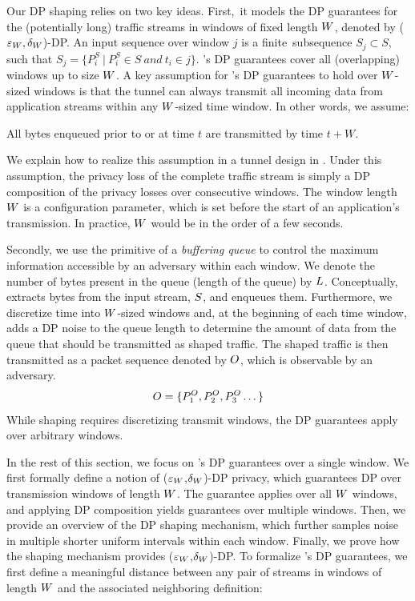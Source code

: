 Our DP shaping relies on two key ideas.
First,~it models the DP guarantees for the (potentially long) traffic streams in windows of fixed length $W$, denoted by \mbox{($\varepsilon_{W}, \delta_{W}$)-DP}.
An input sequence over window $j$ is a finite~sub\-sequence $S_{j} \subset S$, such that $S_{j} = \{ P^S_i~|~P^S_i \in S~and~t_i \in j \}$.
{\sys}'s DP guarantees cover all (overlapping) windows up to size $W$.
A key assumption for {\sys}'s DP guarantees to hold over $W$-sized windows is that the tunnel can always transmit all incoming data from application streams within any $W$-sized time window.
In other words, we assume:
\begin{assumption}\label{assumption:window}
  All bytes enqueued prior to or at time $t$ are transmitted by time
  $t+W$.
\end{assumption}
We explain how to realize this assumption in a tunnel design in .
Under this assumption, the privacy loss of the complete traffic stream is simply a DP composition of the privacy losses over consecutive windows.
The window length $W$ is a configuration parameter, which is set before the start of an application's transmission. In practice, $W$ would be in the order of a few seconds.

Secondly, we use the primitive of a {\em buffering queue} to control the maximum information accessible by an adversary within each window.
We denote the number of bytes present in the queue (\ie length of the queue) by $L$.
Conceptually, {\sys} extracts bytes from the input stream, $S$, and enqueues them.
Furthermore, we discretize time into $W$-sized windows and, at the beginning of each time window, {\sys} adds a DP noise to the queue length to determine the amount of data from the queue that should be transmitted as shaped traffic.
The shaped traffic is then transmitted as a packet sequence denoted by $O$, which is observable by an adversary.
\begin{equation}
    O = \{{P^O_1}, {P^O_2}, {P^O_3} \dots \}
\end{equation}
While shaping requires discretizing transmit windows, the DP guarantees apply over arbitrary windows.

In the rest of this section, we focus on {\sys}'s DP guarantees over a single window.
We first formally define a notion of ($\varepsilon_W$,$\delta_W$)-DP privacy, which guarantees DP over transmission windows of length $W$.
The guarantee applies over all $W$ windows, and applying DP composition yields guarantees over multiple windows.
Then, we provide an overview of the DP shaping mechanism, which further samples noise in multiple shorter uniform intervals within each window.
Finally, we prove how the shaping mechanism provides ($\varepsilon_W$,$\delta_W$)-DP.
To formalize {\sys}'s DP guarantees, we first define a meaningful distance between any pair of streams in windows of length $W$ and the associated neighboring definition:


